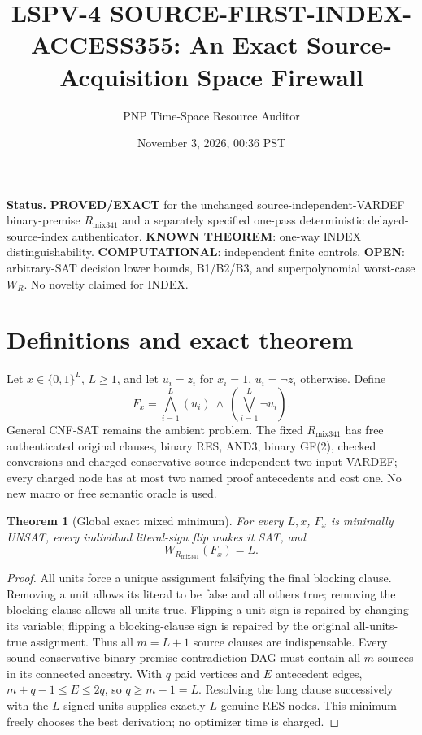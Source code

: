 \documentclass[11pt]{article}
\title{LSPV-4 SOURCE-FIRST-INDEX-ACCESS355: An Exact Source-Acquisition Space Firewall}
\author{PNP Time-Space Resource Auditor}
\date{November 3, 2026, 00:36 PST}
\newtheorem{theorem}{Theorem}
\begin{document}
\maketitle
\noindent \textbf{Status.} \textbf{PROVED/EXACT} for the unchanged source-independent-VARDEF binary-premise $R_{\mathrm{mix341}}$ and a separately specified one-pass deterministic delayed-source-index authenticator. \textbf{KNOWN THEOREM}: one-way INDEX distinguishability. \textbf{COMPUTATIONAL}: independent finite controls. \textbf{OPEN}: arbitrary-SAT decision lower bounds, B1/B2/B3, and superpolynomial worst-case $W_R$. No novelty claimed for INDEX.

\section*{Definitions and exact theorem}
Let $x\in\{0,1\}^L$, $L\ge1$, and let $u_i=z_i$ for $x_i=1$, $u_i=\neg z_i$ otherwise. Define
\[
F_x=\bigwedge_{i=1}^L(u_i)\ \wedge\ 
\left(\bigvee_{i=1}^L\neg u_i\right).
\]
General CNF-SAT remains the ambient problem. The fixed $R_{\mathrm{mix341}}$ has free authenticated original clauses, binary RES, AND3, binary GF(2), checked conversions and charged conservative source-independent two-input VARDEF; every charged node has at most two named proof antecedents and cost one. No new macro or free semantic oracle is used.

\begin{theorem}[Global exact mixed minimum]
For every $L,x$, $F_x$ is minimally UNSAT, every individual literal-sign flip makes it SAT, and
\[
\boxed{W_{R_{\mathrm{mix341}}}(F_x)=L.}
\]
\end{theorem}
\begin{proof}
All units force a unique assignment falsifying the final blocking clause. Removing a unit allows its literal to be false and all others true; removing the blocking clause allows all units true. Flipping a unit sign is repaired by changing its variable; flipping a blocking-clause sign is repaired by the original all-units-true assignment. Thus all $m=L+1$ source clauses are indispensable. Every sound conservative binary-premise contradiction DAG must contain all $m$ sources in its connected ancestry. With $q$ paid vertices and $E$ antecedent edges, $m+q-1\le E\le2q$, so $q\ge m-1=L$. Resolving the long clause successively with the $L$ signed units supplies exactly $L$ genuine RES nodes. This minimum freely chooses the best derivation; no optimizer time is charged.
\end{proof}
\end{document}

